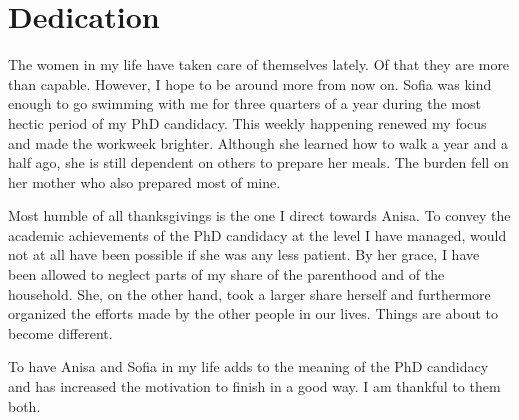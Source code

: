 \chapter{Dedication}

The women in my life have taken care of themselves lately. Of that they are more than capable. However, I hope to be around more from now on. Sofia was kind enough to go swimming with me for three quarters of a year during the most hectic period of my PhD candidacy. This weekly happening renewed my focus and made the workweek brighter. Although she learned how to walk a year and a half ago, she is still dependent on others to prepare her meals. The burden fell on her mother who also prepared most of mine.

Most humble of all thanksgivings is the one I direct towards Anisa. To convey the academic achievements of the PhD candidacy at the level I have managed, would not at all have been possible if she was any less patient. By her grace, I have been allowed to neglect parts of my share of the parenthood and of the household. She, on the other hand, took a larger share herself and furthermore organized the efforts made by the other people in our lives. Things are about to become different.

To have Anisa and Sofia in my life adds to the meaning of the PhD candidacy and has increased the motivation to finish in a good way. I am thankful to them both.


